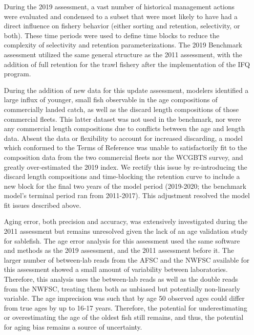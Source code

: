 \documentclass[11pt,
  english,
  a4paper,
]{article}
\begin{document}
\leavevmode\tagmcend\tagstructend\par


During the 2019 assessment, a vast number of historical management actions were evaluated and condensed to a subset that were most likely to have had a direct influence on fishery behavior (either sorting and retention, selectivity, or both). These time periods were used to define time blocks to reduce the complexity of selectivity and retention parameterizations. The 2019 Benchmark assessment utilized the same general structure as the 2011 assessment, with the addition of full retention for the trawl fishery after the implementation of the IFQ program.

\leavevmode\tagmcend\tagstructend\par


During the addition of new data for this update assessment, modelers identified a large influx of younger, small fish observable in the age compositions of commercially landed catch, as well as the discard length compositions of those commercial fleets. This latter dataset was not used in the benchmark, nor were any commercial length compositions due to conflicts between the age and length data. Absent the data or flexibility to account for increased discarding, a model which conformed to the Terms of Reference was unable to satisfactorily fit to the composition data from the two commercial fleets nor the WCGBTS survey, and greatly over-estimated the 2019 index. We rectify this issue by re-introducing the discard length compositions and time-blocking the retention curve to include a new block for the final two years of the model period (2019-2020; the benchmark model's terminal period ran from 2011-2017). This adjustment resolved the model fit issues described above.

\leavevmode\tagmcend\tagstructend\par


Aging error, both precision and accuracy, was extensively investigated during the 2011 assessment but remains unresolved given the lack of an age validation study for sablefish. The age error analysis for this assessment used the same software and methods as the 2019 assessment, and the 2011 assessment before it. The larger number of between-lab reads from the AFSC and the NWFSC available for this assessment showed a small amount of variability between laboratories. Therefore, this analysis uses the between-lab reads as well as the double reads from the NWFSC, treating them both as unbiased but potentially non-linearly variable. The age imprecision was such that by age 50 observed ages could differ from true ages by up to 16-17 years. Therefore, the potential for underestimating or overestimating the age of the oldest fish still remains, and thus, the potential for aging bias remains a source of uncertainty.
\end{document}
